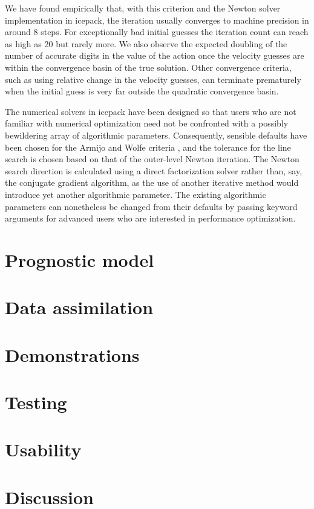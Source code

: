 \documentclass{article}
\theoremstyle{definition}
\theoremstyle{plain}
\begin{document}
We have found empirically that, with this criterion and the Newton solver implementation in icepack, the iteration usually converges to machine precision in around 8 steps.
For exceptionally bad initial guesses the iteration count can reach as high as 20 but rarely more.
We also observe the expected doubling of the number of accurate digits in the value of the action once the velocity guesses are within the convergence basin of the true solution.
Other convergence criteria, such as using relative change in the velocity guesses, can terminate prematurely when the initial guess is very far outside the quadratic convergence basin.

The numerical solvers in icepack have been designed so that users who are not familiar with numerical optimization need not be confronted with a possibly bewildering array of algorithmic parameters.
Consequently, sensible defaults have been chosen for the Armijo and Wolfe criteria \citep{nocedal2006numerical}, and the tolerance for the line search is chosen based on that of the outer-level Newton iteration.
The Newton search direction is calculated using a direct factorization solver rather than, say, the conjugate gradient algorithm, as the use of another iterative method would introduce yet another algorithmic parameter.
The existing algorithmic parameters can nonetheless be changed from their defaults by passing keyword arguments for advanced users who are interested in performance optimization.


\section{Prognostic model}


\section{Data assimilation}


\section{Demonstrations}


\section{Testing}


\section{Usability}


\section{Discussion}



\end{document}
